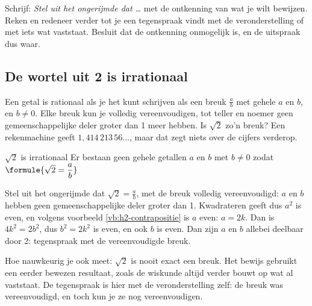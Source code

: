 \begin{werkwijze}
Schrijf: \textit{Stel uit het ongerijmde dat \ldots} met de ontkenning van wat je wilt bewijzen. Reken en redeneer verder tot je een tegenspraak vindt met de veronderstelling of met iets wat vaststaat. Besluit dat de ontkenning onmogelijk is, en de uitspraak dus waar.
\end{werkwijze}

\begin{oefeningen}

\end{oefeningen}

\subsection{De wortel uit 2 is irrationaal}

Een getal is rationaal als je het kunt schrijven als een breuk $\frac{a}{b}$ met gehele $a$ en $b$, en $b \neq 0$. Elke breuk kun je volledig vereenvoudigen, tot teller en noemer geen gemeenschappelijke deler groter dan 1 meer hebben. Is $\sqrt2$ zo'n breuk? Een rekenmachine geeft $1{,}414\,213\,56\ldots$, maar dat zegt niets over de cijfers verderop.

\begin{theorie}
\begin{stelling}{$\sqrt2$ is irrationaal}
Er bestaan geen gehele getallen $a$ en $b$ met $b \neq 0$ zodat \quad $\formule{\sqrt2 = \dfrac{a}{b}}$
\end{stelling}

\begin{bewijs}
Stel uit het ongerijmde dat $\sqrt2 = \frac{a}{b}$, met de breuk volledig vereenvoudigd: $a$ en $b$ hebben geen gemeenschappelijke deler groter dan 1. Kwadrateren geeft
dus $a^2$ is even, en volgens voorbeeld \ref{vb:h2-contrapositie} is $a$ even: $a = 2k$. Dan is $4k^2 = 2b^2$, dus $b^2 = 2k^2$ is even, en ook $b$ is even. Dan zijn $a$ en $b$ allebei deelbaar door 2: tegenspraak met de vereenvoudigde breuk.
\end{bewijs}
\end{theorie}

Hoe nauwkeurig je ook meet: $\sqrt2$ is nooit exact een breuk. Het bewijs gebruikt een eerder bewezen resultaat, zoals de wiskunde altijd verder bouwt op wat al vaststaat. De tegenspraak is hier met de veronderstelling zelf: de breuk was vereenvoudigd, en toch kun je ze nog vereenvoudigen.

